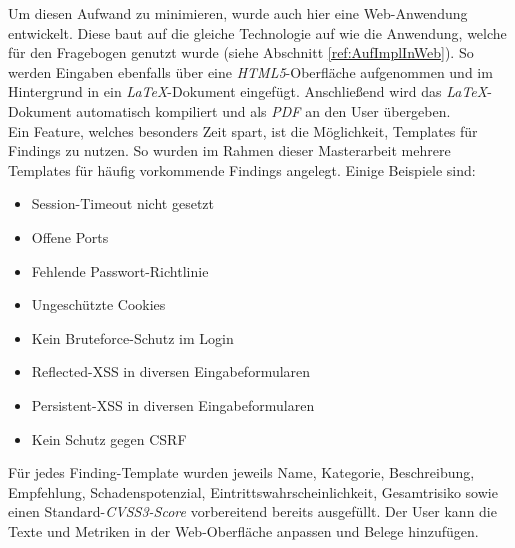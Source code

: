 	Um diesen Aufwand zu minimieren, wurde auch hier eine Web-Anwendung entwickelt. Diese baut auf die gleiche Technologie auf wie die Anwendung, welche für den Fragebogen genutzt wurde (siehe Abschnitt \ref{ref:AufImplInWeb}). So werden Eingaben ebenfalls über eine \textit{HTML5}-Oberfläche aufgenommen und im Hintergrund in ein \textit{LaTeX}-Dokument eingefügt. Anschließend wird das \textit{LaTeX}-Dokument automatisch kompiliert und als \textit{PDF} an den User übergeben.\\
	
	Ein Feature, welches besonders Zeit spart, ist die Möglichkeit, Templates für Findings zu nutzen. So wurden im Rahmen dieser Masterarbeit mehrere Templates für häufig vorkommende Findings angelegt. Einige Beispiele sind:
	\begin{itemize}
		\item Session-Timeout nicht gesetzt
		\item Offene Ports
		\item Fehlende Passwort-Richtlinie
		\item Ungeschützte Cookies
		\item Kein Bruteforce-Schutz im Login
		\item Reflected-XSS in diversen Eingabeformularen
		\item Persistent-XSS in diversen Eingabeformularen
		\item Kein Schutz gegen CSRF
	\end{itemize}
	
	Für jedes Finding-Template wurden jeweils Name, Kategorie, Beschreibung, Empfehlung, Schadenspotenzial, Eintrittswahrscheinlichkeit, Gesamtrisiko sowie einen Standard-\textit{CVSS3-Score} vorbereitend bereits ausgefüllt. Der User kann die Texte und Metriken in der Web-Oberfläche anpassen und Belege hinzufügen.
	